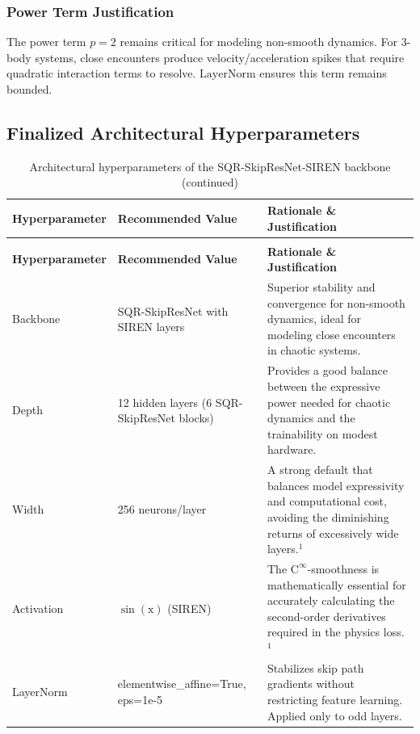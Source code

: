 \documentclass{article}
\begin{document}
    

\subsubsection*{Power Term Justification}
The power term $p = 2$ remains critical for modeling non-smooth dynamics. For 3-body systems, close encounters produce velocity/acceleration spikes that require quadratic interaction terms to resolve. $\text{LayerNorm}$ ensures this term remains bounded.
\subsection{Finalized Architectural Hyperparameters}

\begin{longtable}{|p{3cm}|p{5cm}|p{8cm}|}
\caption{Architectural hyperparameters of the SQR-SkipResNet-SIREN backbone}\label{tab:architectural_hyperparameters}\\
\hline
\textbf{Hyperparameter} & \textbf{Recommended Value} & \textbf{Rationale \& Justification} \\
\hline
\endfirsthead
\caption[]{Architectural hyperparameters of the SQR-SkipResNet-SIREN backbone (continued)}\\
\hline
\textbf{Hyperparameter} & \textbf{Recommended Value} & \textbf{Rationale \& Justification} \\
\hline
\endhead
\hline
\endfoot
\hline
\endlastfoot
Backbone & SQR-SkipResNet with SIREN layers & Superior stability and convergence for non-smooth dynamics, ideal for modeling close encounters in chaotic systems. \\
\hline
Depth & 12 hidden layers (6 SQR-SkipResNet blocks) & Provides a good balance between the expressive power needed for chaotic dynamics and the trainability on modest hardware. \\
\hline
Width & 256 neurons/layer & A strong default that balances model expressivity and computational cost, avoiding the diminishing returns of excessively wide layers.$^1$ \\
\hline
Activation & $\sin(\mathrm{x})$ (SIREN) & The $\mathrm{C}^\infty$-smoothness is mathematically essential for accurately calculating the second-order derivatives required in the physics loss.$^1$ \\
\hline
LayerNorm & elementwise\_affine=True, eps=1e-5 & Stabilizes skip path gradients without restricting feature learning. Applied only to odd layers.\\

\end{longtable}
\end{document}
